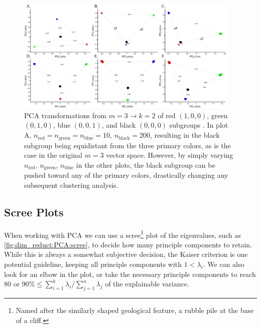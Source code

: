 \begin{figure}[H]
\centering
\includegraphics[width=0.95\textwidth]{figures/dim_reduct/Elhaik_2022_fig4.png}
\caption{
PCA transformations from $m=3 \to k=2$ of
red $(1,0,0)$, green $(0,1,0)$, blue $(0,0,1)$, and black $(0,0,0)$ subgroups
\cite{Elhaik_2022}.
In plot A, $n_{\text{red}} = n_{\text{green}} = n_{\text{blue}} = \num{10}$, $n_{\text{black}} = \num{200}$,
resulting in the black subgroup being equidistant from the three primary colors,
as is the case in the original $m=3$ vector space.
However, by simply varying $n_{\text{red}}$, $n_{\text{green}}$, $n_{\text{blue}}$ in the other plots,
the black subgroup can be pushed toward any of the primary colors,
drastically changing any subsequent clustering analysis.
}
  \label{fig:dim_reduct:PCA_clustering_bias}
\end{figure}

\subsection{Scree Plots}
\label{dim_reduct:PCA:scree}

When working with PCA we can use a
scree\footnote{Named after the similarly shaped geological feature, a rubble pile at the base of a cliff.} plot \cite{scree}
of the eigenvalues, such as \cref{fig:dim_reduct:PCA:scree},
to decide how many principle components to retain.
While this is always a somewhat subjective decision,
the Kaiser criterion \cite{kaiser_criterion} is one potential guideline,
keeping all principle components with $1 < \lambda_{i}$.
We can also look for an elbow in the plot,
or take the necessary principle components to reach
\si{80}{\percent} or $\si{90}{\percent} \leq \sum_{i=1}^{k} \lambda_{i} / \sum_{j=1}^{n} \lambda_{j}$ of the explainable variance.

